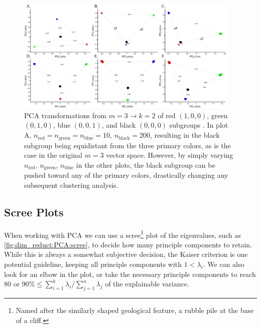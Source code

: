 \begin{figure}[H]
\centering
\includegraphics[width=0.95\textwidth]{figures/dim_reduct/Elhaik_2022_fig4.png}
\caption{
PCA transformations from $m=3 \to k=2$ of
red $(1,0,0)$, green $(0,1,0)$, blue $(0,0,1)$, and black $(0,0,0)$ subgroups
\cite{Elhaik_2022}.
In plot A, $n_{\text{red}} = n_{\text{green}} = n_{\text{blue}} = \num{10}$, $n_{\text{black}} = \num{200}$,
resulting in the black subgroup being equidistant from the three primary colors,
as is the case in the original $m=3$ vector space.
However, by simply varying $n_{\text{red}}$, $n_{\text{green}}$, $n_{\text{blue}}$ in the other plots,
the black subgroup can be pushed toward any of the primary colors,
drastically changing any subsequent clustering analysis.
}
  \label{fig:dim_reduct:PCA_clustering_bias}
\end{figure}

\subsection{Scree Plots}
\label{dim_reduct:PCA:scree}

When working with PCA we can use a
scree\footnote{Named after the similarly shaped geological feature, a rubble pile at the base of a cliff.} plot \cite{scree}
of the eigenvalues, such as \cref{fig:dim_reduct:PCA:scree},
to decide how many principle components to retain.
While this is always a somewhat subjective decision,
the Kaiser criterion \cite{kaiser_criterion} is one potential guideline,
keeping all principle components with $1 < \lambda_{i}$.
We can also look for an elbow in the plot,
or take the necessary principle components to reach
\si{80}{\percent} or $\si{90}{\percent} \leq \sum_{i=1}^{k} \lambda_{i} / \sum_{j=1}^{n} \lambda_{j}$ of the explainable variance.

